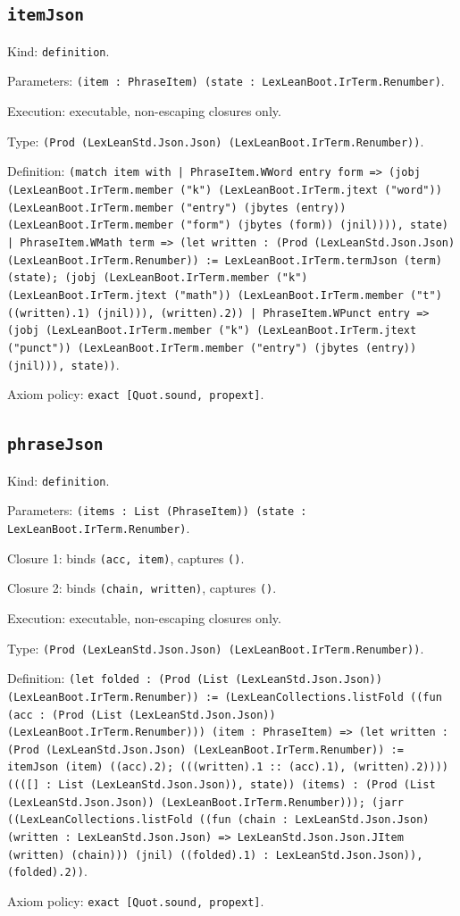\documentclass[11pt]{article}
\begin{document}
\subsection*{\texttt{itemJson}}
\noindent Kind: \texttt{definition}.\par
\noindent Parameters: \texttt{(item : PhraseItem) (state : LexLeanBoot.IrTerm.Renumber)}.\par
\noindent Execution: executable, non-escaping closures only.\par
\noindent Type: \texttt{(Prod (LexLeanStd.Json.Json) (LexLeanBoot.IrTerm.Renumber))}.\par
\noindent Definition: \texttt{(match item with | PhraseItem.WWord entry form => (jobj (LexLeanBoot.IrTerm.member ("k") (LexLeanBoot.IrTerm.jtext ("word")) (LexLeanBoot.IrTerm.member ("entry") (jbytes (entry)) (LexLeanBoot.IrTerm.member ("form") (jbytes (form)) (jnil)))), state) | PhraseItem.WMath term => (let written : (Prod (LexLeanStd.Json.Json) (LexLeanBoot.IrTerm.Renumber)) := LexLeanBoot.IrTerm.termJson (term) (state); (jobj (LexLeanBoot.IrTerm.member ("k") (LexLeanBoot.IrTerm.jtext ("math")) (LexLeanBoot.IrTerm.member ("t") ((written).1) (jnil))), (written).2)) | PhraseItem.WPunct entry => (jobj (LexLeanBoot.IrTerm.member ("k") (LexLeanBoot.IrTerm.jtext ("punct")) (LexLeanBoot.IrTerm.member ("entry") (jbytes (entry)) (jnil))), state))}.\par
\noindent Axiom policy: \texttt{exact [Quot.sound, propext]}.\par
\subsection*{\texttt{phraseJson}}
\noindent Kind: \texttt{definition}.\par
\noindent Parameters: \texttt{(items : List (PhraseItem)) (state : LexLeanBoot.IrTerm.Renumber)}.\par
\noindent Closure 1: binds \texttt{(acc, item)}, captures \texttt{()}.\par
\noindent Closure 2: binds \texttt{(chain, written)}, captures \texttt{()}.\par
\noindent Execution: executable, non-escaping closures only.\par
\noindent Type: \texttt{(Prod (LexLeanStd.Json.Json) (LexLeanBoot.IrTerm.Renumber))}.\par
\noindent Definition: \texttt{(let folded : (Prod (List (LexLeanStd.Json.Json)) (LexLeanBoot.IrTerm.Renumber)) := (LexLeanCollections.listFold ((fun (acc : (Prod (List (LexLeanStd.Json.Json)) (LexLeanBoot.IrTerm.Renumber))) (item : PhraseItem) => (let written : (Prod (LexLeanStd.Json.Json) (LexLeanBoot.IrTerm.Renumber)) := itemJson (item) ((acc).2); (((written).1 :: (acc).1), (written).2)))) ((([] : List (LexLeanStd.Json.Json)), state)) (items) : (Prod (List (LexLeanStd.Json.Json)) (LexLeanBoot.IrTerm.Renumber))); (jarr ((LexLeanCollections.listFold ((fun (chain : LexLeanStd.Json.Json) (written : LexLeanStd.Json.Json) => LexLeanStd.Json.Json.JItem (written) (chain))) (jnil) ((folded).1) : LexLeanStd.Json.Json)), (folded).2))}.\par
\noindent Axiom policy: \texttt{exact [Quot.sound, propext]}.\par
\end{document}

